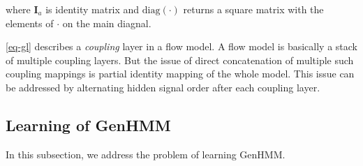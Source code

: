 \documentclass[letterpaper]{article} %
\begin{document}
where $\bm{I}_a$ is identity matrix and $\mathrm{diag}(\cdot)$ returns a square matrix with the elements of $\cdot$ on the main diagnal.

\eqref{eq-gl} describes a \textit{coupling} layer in a flow model. A flow model is basically a stack of multiple coupling layers. But the issue of direct concatenation of multiple such coupling mappings is partial identity mapping of the whole model. This issue can be addressed by alternating hidden signal order after each coupling layer.


\subsection{Learning of GenHMM}\label{subsec:optmGenHMM}
In this subsection, we address the problem of learning GenHMM.
\end{document}
